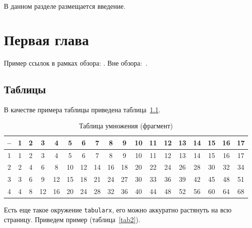\documentclass[specification,annotation,times]{itmo-student-thesis.cls}
\begin{document}

\tableofcontents

\startprefacepage

В данном разделе размещается введение.

\chapter{Первая глава}

\startrelatedwork
Пример ссылок в рамках обзора: \cite{example-english, example-russian, unrestricted-jump-evco, nsga-ii-steady-state}.
\finishrelatedwork
Вне обзора:~\cite{bellman}.

\section{Таблицы}\label{sec:tables}

В качестве примера таблицы приведена таблица~\ref{tab1}.

\begin{table}[!h]
\caption{Таблица умножения (фрагмент)}\label{tab1}
\centering
\begin{tabular}{|*{18}{c|}}\hline
-- & 1 & 2 & 3 & 4 & 5 & 6 & 7 & 8 & 9 & 10 & 11 & 12 & 13 & 14 & 15 & 16 & 17 \\\hline
1  & 1 & 2 & 3 & 4 & 5 & 6 & 7 & 8 & 9 & 10 & 11 & 12 & 13 & 14 & 15 & 16 & 17 \\\hline
2  & 2 & 4 & 6 & 8 & 10 & 12 & 14 & 16 & 18 & 20 & 22 & 24 & 26 & 28 & 30 & 32 & 34 \\\hline
3  & 3 & 6 & 9 & 12 & 15 & 18 & 21 & 24 & 27 & 30 & 33 & 36 & 39 & 42 & 45 & 48 & 51 \\\hline
4  & 4 & 8 & 12 & 16 & 20 & 24 & 28 & 32 & 36 & 40 & 44 & 48 & 52 & 56 & 60 & 64 & 68 \\\hline
\end{tabular}
\end{table}

Есть еще такое окружение \texttt{tabularx}, его можно аккуратно растянуть на всю страницу.
Приведем пример (таблица~\ref{tab2}).
\end{document}
